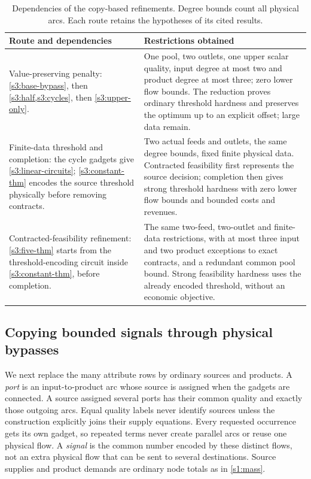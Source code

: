 \begin{table}[!ht]
\centering
\small
\begin{tabular}{@{}>{\raggedright\arraybackslash}p{.46\linewidth}>{\raggedright\arraybackslash}p{.49\linewidth}@{}}
\toprule
Route and dependencies & Restrictions obtained\\
\midrule
Value-preserving penalty: \cref{s3:base-bypass}, then
\cref{s3:half,s3:cycles}, then \cref{s3:upper-only}.
& One pool, two outlets, one upper scalar quality, input degree at most
two and product degree at most three; zero lower flow bounds.
The reduction proves ordinary threshold hardness and preserves the
optimum up to an explicit offset; large data remain.\\
\addlinespace
Finite-data threshold and completion: the cycle gadgets give
\cref{s3:linear-circuits}; \cref{s3:constant-thm} encodes the source
threshold physically before removing contracts.
& Two actual feeds and outlets, the same degree bounds, fixed finite
physical data. Contracted feasibility first represents the source
decision; completion then gives strong threshold hardness with zero
lower flow bounds and bounded costs and revenues.\\
\addlinespace
Contracted-feasibility refinement: \cref{s3:five-thm} starts from the
threshold-encoding circuit inside \cref{s3:constant-thm}, before
completion.
& The same two-feed, two-outlet and finite-data restrictions, with
at most three input and two product exceptions to exact contracts, and a
redundant common pool bound. Strong feasibility hardness uses the
already encoded threshold, without an economic objective.\\
\bottomrule
\end{tabular}
\caption{Dependencies of the copy-based refinements. Degree bounds count
all physical arcs. Each route retains the hypotheses of its cited results.}
\label{s3:refinement-guide}
\end{table}

\subsection{Copying bounded signals through physical bypasses}\label{s3:copy}

We next replace the many attribute rows by ordinary sources and products.
A \emph{port} is an input-to-product arc whose source is assigned when
the gadgets are connected. A source assigned several ports has their
common quality and exactly those outgoing arcs. Equal quality labels
never identify sources unless the construction explicitly joins their
supply equations. Every requested occurrence gets its own gadget, so
repeated terms never create parallel arcs or reuse one physical flow.
A \emph{signal} is the common number encoded by these distinct flows,
not an extra physical flow that can be sent to several destinations.
Source supplies and product demands are ordinary node totals as in
\cref{s1:mass}.

